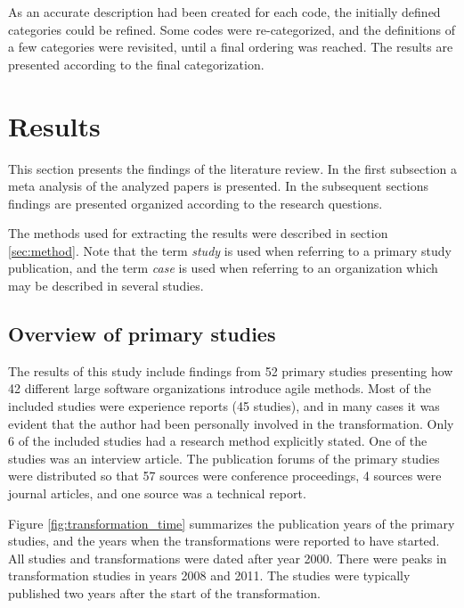 As an accurate description had been created for each code, the initially defined
categories could be refined. Some codes were re-categorized, and the definitions
of a few categories were revisited, until a final ordering was reached. The
results are presented according to the final categorization.



\clearpage

\chapter{Results}
\label{sec:results}

This section presents the findings of the literature review. In the first
subsection a meta analysis of the analyzed papers is presented. In the
subsequent sections findings are presented organized according to the research
questions.

The methods used for extracting the results were described in section
\ref{sec:method}. Note that the term \emph{study} is used when referring to a
primary study publication, and the term \emph{case} is used when referring to an
organization which may be described in several studies.

\section{Overview of primary studies}

The results of this study include findings from 52 primary studies presenting
how 42 different large software organizations introduce agile methods. Most of
the included studies were experience reports (45 studies), and in many cases it
was evident that the author had been personally involved in the transformation.
Only 6 of the included studies had a research method explicitly stated. One of
the studies was an interview article. The publication forums of the primary
studies were distributed so that 57 sources were conference proceedings, 4
sources were journal articles, and one source was a technical report.

Figure \ref{fig:transformation_time} summarizes the publication years of the
primary studies, and the years when the transformations were reported to have
started. All studies and transformations were dated after year 2000. There were
peaks in transformation studies in years 2008 and 2011. The studies were
typically published two years after the start of the transformation.

